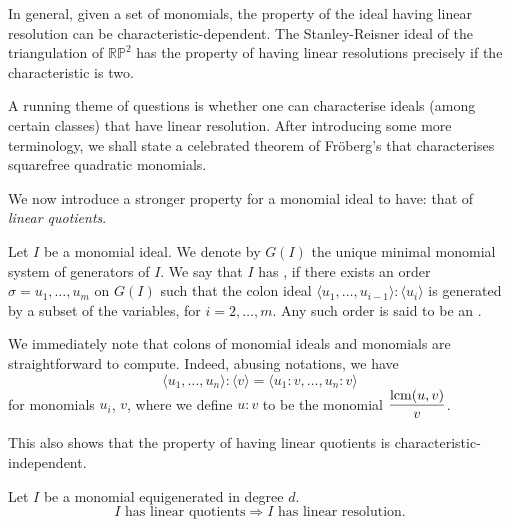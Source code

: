\documentclass[12pt]{article}
\begin{document}
\begin{rem}
	In general, given a set of monomials, the property of the ideal having linear resolution can be characteristic-dependent. The Stanley-Reisner ideal of the triangulation of $\mathbb{R}\mathbb{P}^{2}$ has the property of having linear resolutions precisely if the characteristic is two.
\end{rem}

A running theme of questions is whether one can characterise ideals (among certain classes) that have linear resolution. After introducing some more terminology, we shall state a celebrated theorem of Fr\"{o}berg's that characterises squarefree quadratic monomials. 

We now introduce a stronger property for a monomial ideal to have: that of \emph{linear quotients}.

\begin{defn} \label{defn:linear-quotients}
	Let $I$ be a monomial ideal. We denote by $G(I)$ the unique minimal monomial system of generators of $I$. We say that $I$ has , if there exists an order $\sigma = u_{1}, \ldots, u_{m}$ on $G(I)$ such that the colon ideal $\langle u_{1}, \ldots, u_{i - 1} \rangle : \langle u_{i} \rangle$ is generated by a subset of the variables, for $i = 2, \ldots, m$. Any such order is said to be an .
\end{defn}

\begin{rem}
	We immediately note that colons of monomial ideals and monomials are straightforward to compute. Indeed, abusing notations, we have
	\begin{equation*} 
		\langle u_{1}, \ldots, u_{n} \rangle : \langle v \rangle = \langle u_{1} : v, \ldots, u_{n} : v \rangle
	\end{equation*}
	for monomials $u_{i}$, $v$, where we define $u : v$ to be the monomial $\dfrac{\operatorname{lcm}(u, v)}{v}$.

	This also shows that the property of having linear quotients is characteristic-independent.
\end{rem}

\begin{thm}
	Let $I$ be a monomial equigenerated in degree $d$. 
	\begin{equation*} 
		I \text{ has linear quotients} \Rightarrow I \text{ has linear resolution}.
	\end{equation*}
\end{thm}
\end{document}
